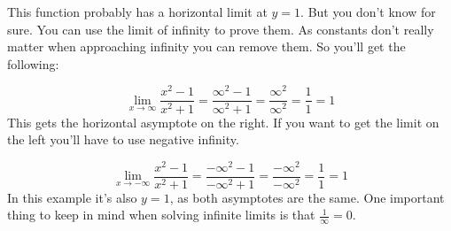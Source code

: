 \begin{figure}[H]
  \begin{center}
  \end{center}
\end{figure}

This function probably has a horizontal limit at \(y=1\).
But you don't know for sure.
You can use the limit of infinity to prove them.
As constants don't really matter when approaching infinity you can remove them.
So you'll get the following:

\[
  \lim_{x \to \infty} \frac{x^2-1}{x^2+1} =
  \frac{\infty^2-1}{\infty^2+1} =
  \frac{\infty^2}{\infty^2} =
  \frac{1}{1} =
  1
\]
This gets the horizontal asymptote on the right.
If you want to get the limit on the left you'll have to use negative infinity.

\[
  \lim_{x \to -\infty} \frac{x^2-1}{x^2+1} =
  \frac{-\infty^2-1}{-\infty^2+1} =
  \frac{-\infty^2}{-\infty^2} =
  \frac{1}{1} =
  1
\]
In this example it's also \(y=1\), as both asymptotes are the same.
One important thing to keep in mind when solving infinite limits is that \(\frac{1}{\infty} = 0\).
